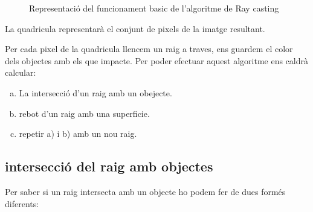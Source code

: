 \documentclass{article}
\begin{document}
\begin{figure}
   
\caption{Representació del funcionament basic de l'algoritme de Ray casting}
\end{figure}

La quadricula representarà el conjunt de pixels de la imatge resultant.

Per cada pixel de la quadricula llencem un raig a traves, ens guardem el color dels objectes amb els que impacte.
Per poder efectuar aquest algoritme ens caldrà calcular:
  \begin{enumerate}[a)]
     \item La intersecció d'un raig amb un obejecte.
     \item rebot d'un raig amb una superficie.
     \item  repetir a) i b) amb un nou raig.
  \end{enumerate} 
\subsection{intersecció del raig amb objectes}
Per saber si un raig intersecta amb un objecte ho podem fer de dues formés diferents:
\end{document}
